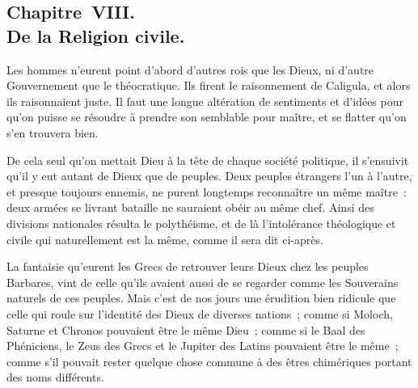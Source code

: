 \documentclass[french,twoside]{book} %
\begin{document}
\subsection[{Chapitre VIII. De la Religion civile.}]{Chapitre VIII. \\
De la Religion civile.}
\noindent Les hommes n’eurent point d’abord d’autres rois que les Dieux, ni d’autre Gouvernement que le théocratique. Ils firent le raisonnement de Caligula, et alors ils raisonnaient juste. Il faut une longue altération de sentiments et d’idées pour qu’on puisse se résoudre à prendre son semblable pour maître, et se flatter qu’on s’en trouvera bien.\par
De cela seul qu’on mettait Dieu à la tête de chaque société politique, il s’ensuivit qu’il y eut autant de Dieux que de peuples. Deux peuples étrangers l’un à l’autre, et presque toujours ennemis, ne purent longtemps reconnaître un même maître : deux armées se livrant bataille ne sauraient obéir au même chef. Ainsi des divisions nationales résulta le polythéisme, et de là l’intolérance théologique et civile qui naturellement est la même, comme il sera dit ci-après.\par
La fantaisie qu’eurent les Grecs de retrouver leurs Dieux chez les peuples Barbares, vint de celle qu’ils avaient aussi de se regarder comme les Souverains naturels de ces peuples. Mais c’est de nos jours une érudition bien ridicule que celle qui roule sur l’identité des Dieux de diverses nations ; comme si Moloch, Saturne et Chronos pouvaient être le même Dieu ; comme si le Baal des Phéniciens, le Zeus des Grecs et le Jupiter des Latins pouvaient être le même ; comme s’il pouvait rester quelque chose commune à des êtres chimériques portant des noms différents.\par
\end{document}
